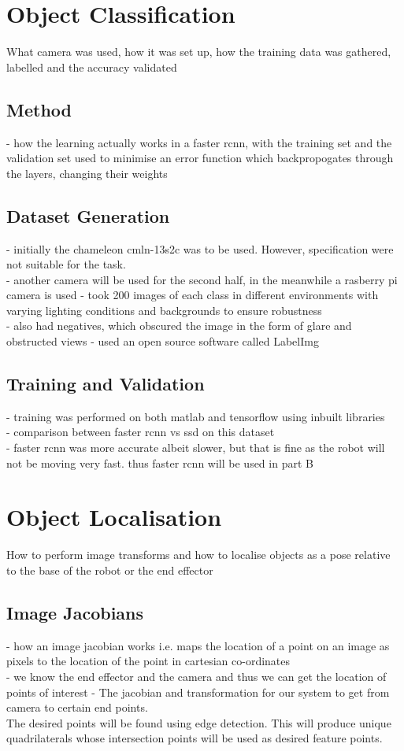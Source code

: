 \documentclass{UoNMCHA}
\numberwithin{equation}{section}
\begin{document}
\newpage
\section{Object Classification}
What camera was used, how it was set up, how the training data was gathered, labelled and the accuracy validated
\subsection{Method}
- how the learning actually works in a faster rcnn, with the training set and the validation set used to minimise an error function which backpropogates through the layers, changing their weights\\
\subsection{Dataset Generation}
- initially the chameleon cmln-13s2c was to be used. However, specification were not suitable for the task.\\
- another camera will be used for the second half, in the meanwhile a rasberry pi camera is used
- took 200 images of each class in different environments with varying lighting conditions and backgrounds to ensure robustness\\
- also had negatives, which obscured the image in the form of glare and obstructed views
- used an open source software called LabelImg

\subsection{Training and Validation}
- training was performed on both matlab and tensorflow using inbuilt libraries\\
- comparison between faster rcnn vs ssd on this dataset \\
- faster rcnn was more accurate albeit slower, but that is fine as the robot will not be moving very fast. thus faster rcnn will be used in part B

\newpage
\section{Object Localisation}

How to perform image transforms and how to localise objects as a pose relative to the base of the robot or the end effector
\subsection{Image Jacobians}
- how an image jacobian works i.e. maps the location of a point on an image as pixels to the location of the point in cartesian co-ordinates\\
- we know the end effector and the camera and thus we can get the location of points of interest
- The jacobian and transformation for our system to get from camera to certain end points.\\
The desired points will be found using edge detection. This will produce unique quadrilaterals whose intersection points will be used as desired feature points.
\end{document}
